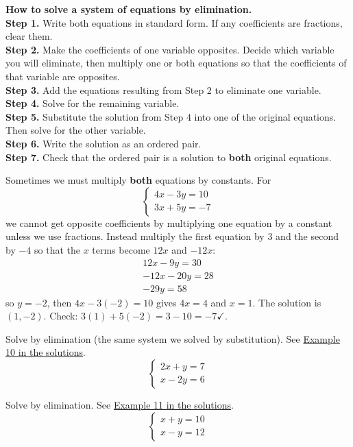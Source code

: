 \documentclass[letter]{article}
\newenvironment{keybox}
  {\begin{lrbox}{\keyboxsave}\begin{minipage}{\dimexpr\linewidth-2\fboxsep-2\fboxrule\relax}}
  {\end{minipage}\end{lrbox}\par\noindent\fbox{\usebox{\keyboxsave}}\par}
\newcommand{\exbox}[1]{\fbox{\textbf{Example #1}}}
\newcommand{\chp}{}
\newcommand{\seesol}[1]{See \hyperref[sec:\chp ex#1]{Example #1 in the solutions}.}
\begin{document}
\begin{keybox}
\textbf{How to solve a system of equations by elimination.}\\
\textbf{Step 1.} Write both equations in standard form. If any coefficients are fractions, clear them.\\
\textbf{Step 2.} Make the coefficients of one variable opposites. Decide which variable you will eliminate, then multiply one or both equations so that the coefficients of that variable are opposites.\\
\textbf{Step 3.} Add the equations resulting from Step 2 to eliminate one variable.\\
\textbf{Step 4.} Solve for the remaining variable.\\
\textbf{Step 5.} Substitute the solution from Step 4 into one of the original equations. Then solve for the other variable.\\
\textbf{Step 6.} Write the solution as an ordered pair.\\
\textbf{Step 7.} Check that the ordered pair is a solution to \textbf{both} original equations.
\end{keybox}

Sometimes we must multiply \textbf{both} equations by constants. For
\[\begin{cases}4x-3y=10\\3x+5y=-7\end{cases}\]
we cannot get opposite coefficients by multiplying one equation by a constant unless we use fractions. Instead multiply the first equation by $3$ and the second by $-4$ so that the $x$ terms become $12x$ and $-12x$:
\[\begin{array}{r}12x-9y=30\\-12x-20y=28\\\hline-29y=58\end{array}\]
so $y=-2$, then $4x-3(-2)=10$ gives $4x=4$ and $x=1$. The solution is $(1,-2)$. Check: $3(1)+5(-2)=3-10=-7\checkmark$.

\exbox{10} Solve by elimination (the same system we solved by substitution). \seesol{10}
\[\begin{cases}2x+y=7\\x-2y=6\end{cases}\]

\exbox{11} Solve by elimination. \seesol{11}
\[\begin{cases}x+y=10\\x-y=12\end{cases}\]
\end{document}
